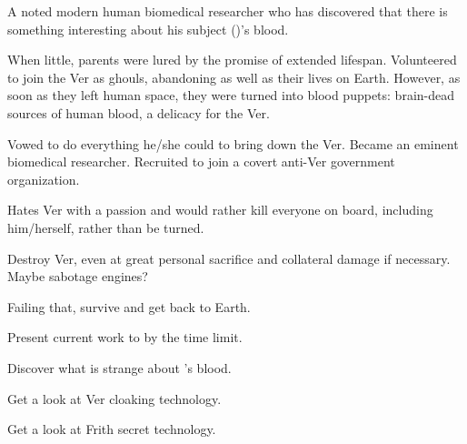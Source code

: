 \documentclass[char]{guildcamp4}
\begin{document}
\name{\cSpite{}}

\begin{itemz}[Backstory]
    \item A noted modern human biomedical researcher who has discovered that there is something interesting about his subject (\cPlead{})'s blood.
    \item When little, parents were lured by the promise of extended lifespan. Volunteered to join the Ver as ghouls, abandoning \cSpite{} as well as their lives on Earth. However, as soon as they left human space, they were turned into blood puppets: brain-dead sources of human blood, a delicacy for the Ver.
    \item Vowed to do everything he/she could to bring down the Ver. Became an eminent biomedical researcher. Recruited to join a covert anti-Ver government organization.
    \item Hates Ver with a passion and would rather kill everyone on board, including him/herself, rather than be turned.
\end{itemz}

\begin{itemz}[Goals]
	\item Destroy Ver, even at great personal sacrifice and collateral damage if necessary. Maybe sabotage engines?
	\item Failing that, survive and get back to Earth.
	\item Present current work to \cVone{} by the time limit.
	\item Discover what is strange about \cPlead{}'s blood.
	\item Get a look at Ver cloaking technology.
	\item Get a look at Frith secret technology.
\end{itemz}

\begin{itemz}[Notes]
	\item 
\end{itemz}

\begin{contacts}
	\contact{\cTest{}}
\end{contacts}
\end{document}

